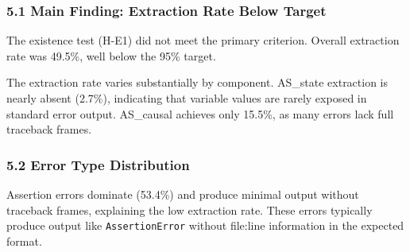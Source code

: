 
\subsubsection{5.1 Main Finding: Extraction Rate Below Target}

The existence test (H-E1) did not meet the primary criterion. Overall extraction rate was 49.5\%, well below the 95\% target.

\begin{table}[htbp]
\centering
{}
\end{table}

The extraction rate varies substantially by component. AS\_state extraction is nearly absent (2.7\%), indicating that variable values are rarely exposed in standard error output. AS\_causal achieves only 15.5\%, as many errors lack full traceback frames.

\subsubsection{5.2 Error Type Distribution}

\begin{table}[htbp]
\centering
{}
\end{table}

Assertion errors dominate (53.4\%) and produce minimal output without traceback frames, explaining the low extraction rate. These errors typically produce output like \texttt{AssertionError} without file:line information in the expected format.

